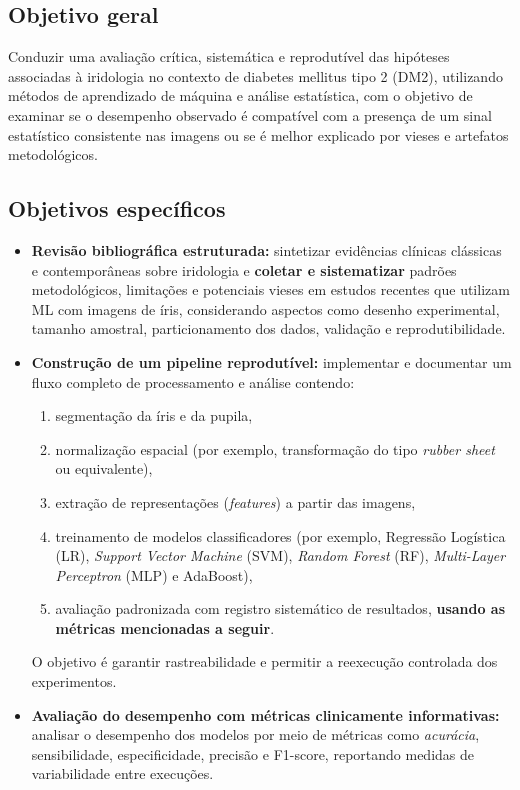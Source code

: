 \documentclass[12pt,a4paper]{article}
\begin{document}
\subsection{Objetivo geral}
Conduzir uma avaliação crítica, sistemática e reprodutível das hipóteses associadas à iridologia no contexto de diabetes mellitus tipo 2 (DM2), utilizando métodos de aprendizado de máquina e análise estatística, com o objetivo de examinar se o desempenho observado é compatível com a presença de um sinal estatístico consistente nas imagens ou se é melhor explicado por vieses e artefatos metodológicos.

\subsection{Objetivos específicos}
\begin{itemize}
    \item \textbf{Revisão bibliográfica estruturada:} sintetizar evidências clínicas clássicas e contemporâneas sobre iridologia e \textbf{coletar e sistematizar} padrões metodológicos, limitações e potenciais vieses em estudos recentes que utilizam ML com imagens de íris, considerando aspectos como desenho experimental, tamanho amostral, particionamento dos dados, validação e reprodutibilidade.

    \item \textbf{Construção de um pipeline reprodutível:} implementar e documentar um fluxo completo de processamento e análise contendo:
    \begin{enumerate}
        \item segmentação da íris e da pupila,
        \item normalização espacial (por exemplo, transformação do tipo \textit{rubber sheet} ou equivalente),
        \item extração de representações (\textit{features}) a partir das imagens,
        \item treinamento de modelos classificadores (por exemplo, Regressão Logística (LR), \textit{Support Vector Machine} (SVM), \textit{Random Forest} (RF), \textit{Multi-Layer Perceptron} (MLP) e AdaBoost),
        \item avaliação padronizada com registro sistemático de resultados, \textbf{usando as métricas mencionadas a seguir}.
    \end{enumerate}
    O objetivo é garantir rastreabilidade e permitir a reexecução controlada dos experimentos.

    \item \textbf{Avaliação do desempenho com métricas clinicamente informativas:} analisar o desempenho dos modelos por meio de métricas como \textit{acurácia}, sensibilidade, especificidade, precisão e F1-score, reportando medidas de variabilidade entre execuções.


\end{itemize}
\end{document}
